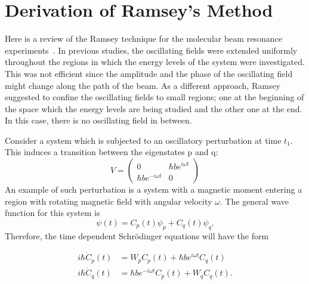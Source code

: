 \chapter{Derivation of Ramsey's Method}
Here is a review of the Ramsey technique for the molecular beam
resonance experiments~\cite{NMR_Notes}. In previous studies, the
oscillating fields were extended uniformly throughout the regions in
which the energy levels of the system were investigated.  This was not
efficient since the amplitude and the phase of the oscillating field
might change along the path of the beam. As a different approach,
Ramsey suggested to confine the oscillating fields to small regions;
one at the beginning of the space which the energy levels are being
studied and the other one at the end. In this case, there is no
oscillating field in between.

Consider a system which is subjected to an oscillatory perturbation at
time $t_1$. This induces a transition between the eigenstates p and q:
\begin{equation}
V=
\left(
\begin{array}{cc}
0 & \hbar b e^{i\omega t} \\ 
\hbar b e^{-i \omega t} & 0
\end{array} 
\right)
\end{equation}
An example of such perturbation is a system with a magnetic moment
entering a region with rotating magnetic field with angular velocity
$\omega$. The general wave function for this system is
\begin{equation}
\psi(t)= C_p (t) \psi_p + C_q(t) \psi_q.
\end{equation}
Therefore, the time dependent Schr\"{o}dinger equations will have the
form

\begin{align}
 \label{eqn:cp}
  i \hbar \dot{C}_p(t)&= W_p C_p(t)+\hbar b e^{i \omega t} C_q(t) \\
   \label{eqn:cq}
i \hbar \dot{C}_q(t)&=\hbar b e^{-i \omega t} C_p(t) +W_q C_q(t).
\end{align}

